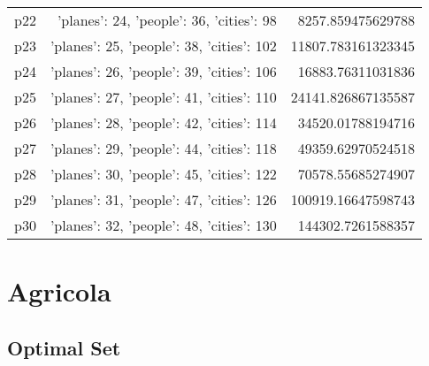 \documentclass{article}
\begin{document}
\begin{center}
\begin{tabular}{r|r|r}
  p22&{'planes': 24, 'people': 36, 'cities': 98}&8257.859475629788\\
  p23&{'planes': 25, 'people': 38, 'cities': 102}&11807.783161323345\\
  p24&{'planes': 26, 'people': 39, 'cities': 106}&16883.76311031836\\
  p25&{'planes': 27, 'people': 41, 'cities': 110}&24141.826867135587\\
  p26&{'planes': 28, 'people': 42, 'cities': 114}&34520.01788194716\\
  p27&{'planes': 29, 'people': 44, 'cities': 118}&49359.62970524518\\
  p28&{'planes': 30, 'people': 45, 'cities': 122}&70578.55685274907\\
  p29&{'planes': 31, 'people': 47, 'cities': 126}&100919.16647598743\\
  p30&{'planes': 32, 'people': 48, 'cities': 130}&144302.7261588357
                            \end{tabular}
                            \end{center}
                    
                            \newpage \section{Agricola}
                    \subsection*{Optimal Set}
                    
\end{document}
